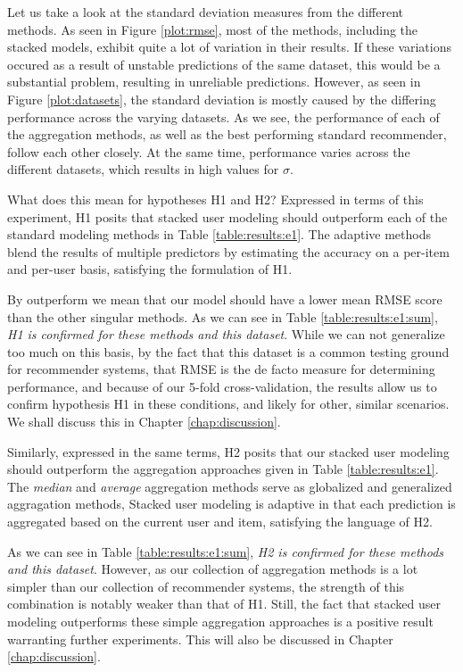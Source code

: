 


Let us take a look at the standard deviation measures from the different methods.
As seen in Figure \ref{plot:rmse}, 
most of the methods, including the stacked models,
exhibit quite a lot of variation in their results.
If these variations occured as a result of unstable
predictions of the same dataset, this would be a substantial problem,
resulting in unreliable predictions.
However, as seen in Figure \ref{plot:datasets},
the standard deviation is mostly caused by the differing
performance across the varying datasets.
As we see, the performance of each of the aggregation methods,
as well as the best performing standard recommender,
follow each other closely. At the same time,
performance varies across the different datasets,
which results in high values for $\sigma$.

What does this mean for hypotheses H1 and H2?
Expressed in terms of this experiment,
H1 posits that stacked user modeling should outperform each of the standard modeling methods
in Table \ref{table:results:e1}.
The adaptive methods blend the results of multiple predictors by estimating the accuracy
on a per-item and per-user basis, satisfying the formulation of H1.

By outperform we mean that our model should have a lower
mean RMSE score than the other singular methods. As we can see in Table \ref{table:results:e1:sum},
\emph{H1 is confirmed for these methods and this dataset}.
While we can not generalize too much on this basis, 
by the fact that this dataset is a common testing ground for recommender systems,
that RMSE is the de facto measure for determining performance,
and because of our 5-fold cross-validation, the results allow us 
to confirm hypothesis H1 in these conditions, and likely for other, similar scenarios.
We shall discuss this in Chapter \ref{chap:discussion}.

Similarly, expressed in the same terms, H2 posits that 
our stacked user modeling should outperform the aggregation approaches
given in Table \ref{table:results:e1}.
The \emph{median} and \emph{average} aggregation methods
serve as globalized and generalized aggragation methods,
Stacked user modeling is adaptive in that each prediction is 
aggregated based on the current user and item,
satisfying the language of H2.

As we can see in Table \ref{table:results:e1:sum},
\emph{H2 is confirmed for these methods and this dataset}.
However, as our collection of aggregation methods is a lot simpler
than our collection of recommender systems, the strength of this combination
is notably weaker than that of H1.
Still, the fact that stacked user modeling outperforms these simple aggregation
approaches is a positive result warranting further experiments.
This will also be discussed in Chapter \ref{chap:discussion}.

